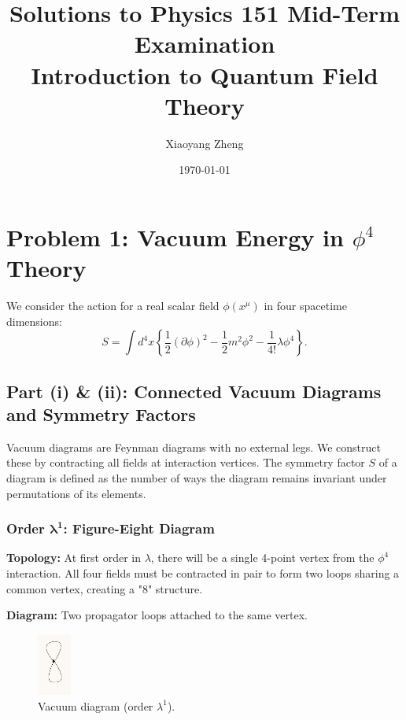 \documentclass[11pt, a4paper]{article}
\newcommand{\be}{\begin{equation}}
\newcommand{\ee}{\end{equation}}
\begin{document}
\title{Solutions to Physics 151 Mid-Term Examination\\
\large Introduction to Quantum Field Theory}
\author{Xiaoyang Zheng}
\date{\today}
\maketitle

\section{Problem 1: Vacuum Energy in $\phi^4$ Theory}

We consider the action for a real scalar field $\phi(x^\mu)$ in four spacetime dimensions:
\be
S=\int d^{4}x\left\{\frac{1}{2}(\partial\phi)^{2}-\frac{1}{2}m^{2}\phi^{2}-\frac{1}{4!}\lambda\phi^{4}\right\}.
\ee

\subsection{Part (i) \& (ii): Connected Vacuum Diagrams and Symmetry Factors}

Vacuum diagrams are Feynman diagrams with no external legs. We construct these by contracting all fields at interaction vertices. The symmetry factor $S$ of a diagram is defined as the number of ways the diagram remains invariant under permutations of its elements.

\subsubsection*{Order $\mathbf{\lambda^1}$: Figure-Eight Diagram}

\textbf{Topology:} At first order in $\lambda$, there will be a single 4-point vertex from the $\phi^4$ interaction. All four fields must be contracted in pair to form two loops sharing a common vertex, creating a "8" structure.

\textbf{Diagram:} Two propagator loops attached to the same vertex.

\begin{figure}[H]
    \centering
    \includegraphics[width=0.1\textwidth]{1-1.jpg}
    \caption{Vacuum diagram (order $\lambda^1$).}
    \label{fig:figure8}
\end{figure}
\end{document}
